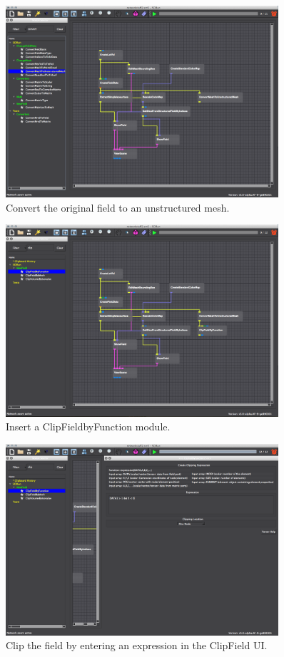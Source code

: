 \documentclass[fleqn,11pt,openany]{book}
\begin{document}
\begin{figure}[H]
\center
\includegraphics[width=0.9\textwidth]{BasicTutorial_figures/convertmesh.png}
\caption{Convert the original field to an unstructured mesh.}
\label{fig:convertmesh}
\end{figure}

\begin{figure}[H]
\center
\includegraphics[width=0.9\textwidth]{BasicTutorial_figures/clipfield.png}
\caption{Insert a ClipFieldbyFunction module.}
\label{fig:clipfield}
\end{figure}

\begin{figure}[H]
\center
\includegraphics[width=0.9\textwidth]{BasicTutorial_figures/clipfield_input.png}
\caption{Clip the field by entering an expression in the ClipField UI.}
\label{fig:clipfield_input}
\end{figure}
\end{document}
